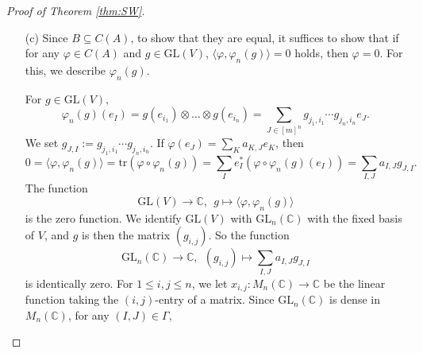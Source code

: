 \documentclass[twoside = false,	%
		headsepline,		%
		parskip = true,
		]{scrbook}						%
\begin{document}
\begin{proof}[Proof of Theorem \ref{thm:SW}]
\begin{enumerate}
            For this note that $C(A)=\mathrm{End}_{\mathfrak{S}_n}(V^{\otimes n})$. This suggests us to consider the projector in $\mathbb{C}[\mathfrak{S}_n]$:
            $$P:\mathrm{End}(V^{\otimes n})\to \mathrm{End}(V^{\otimes n}),\ \ \varphi\mapsto\frac{1}{\#\mathfrak{S}_n}\sum_{\sigma\in\mathfrak{S}_n}\rho_n(\sigma)\circ\varphi\circ\rho_n(\sigma^{-1}).$$
            The image of the projector is exactly $C(A)$. Moreover, if $\psi\in C(A)$ and $\varphi\in\mathrm{End}(V^{\otimes n})$ then 
            $$\langle P(\varphi),\psi\rangle=\frac{1}{\#\mathfrak{S}_n}\sum_{\sigma\in\mathfrak{S}_n}\mathrm{tr}(\rho_n(\sigma)\varphi\rho_n(\sigma^{-1})\psi)=\mathrm{tr}(\varphi\psi)=\langle\varphi,\psi\rangle$$
            since $\psi$ commutes with $\rho_n(\sigma^{-1})$.
        
            If $\psi\in C(A)$ is orthogonal to the entire $C(A)$ with respect to $\langle-,-\rangle$, then for any $\varphi\in\mathrm{End}(V^{\otimes n})$, 
            $$\langle\varphi,\psi\rangle=\langle P(\varphi),\psi\rangle=0,$$
            and hence $\psi=0$ since $\langle-,-\rangle$ is non-degenerate on $\mathrm{End}(V^{\otimes n})$.
            \item[(c)] Since $B\subseteq C(A)$, to show that they are equal, it suffices to show that if for any $\varphi\in C(A)$ and $g\in\mathrm{GL}(V)$, $\langle\varphi,\varphi_n(g)\rangle=0$ holds, then $\varphi=0$. For this, we describe $\varphi_n(g)$. 
        
            For $g\in\mathrm{GL}(V)$, 
            $$\varphi_n(g)(e_I)=g(e_{i_1})\otimes\ldots\otimes g(e_{i_n})=\sum_{J\in [m]^n}g_{j_1,i_1}\cdots g_{j_n,i_n}e_J.$$
            We set $g_{J,I}:=g_{j_1,i_1}\cdots g_{j_n,i_n}$. If $\varphi(e_J)=\sum_{K}a_{K,J}e_K$, then
            $$0=\langle\varphi,\varphi_n(g)\rangle=\mathrm{tr}(\varphi\circ\varphi_n(g))=\sum_{I}e_I^*(\varphi\circ\varphi_n(g)(e_I))=\sum_{I,J}a_{I,J}g_{J,I}.$$
            The function 
            $$\mathrm{GL}(V)\to \mathbb{C},\ \ g\mapsto \langle\varphi,\varphi_n(g)\rangle$$
            is the zero function. We identify $\mathrm{GL}(V)$ with $\mathrm{GL}_n(\mathbb{C})$ with the fixed basis of $V$, and  $g$ is then the matrix $(g_{i,j})$. So the function
            $$\mathrm{GL}_n(\mathbb{C})\to \mathbb{C},\ \ (g_{i,j})\mapsto \sum_{I,J}a_{I,J}g_{J,I}$$
            is identically zero. For $1\leq i,j\leq n$, we let $x_{i,j}:M_n(\mathbb{C})\to\mathbb{C}$ be the linear function taking the $(i,j)$-entry of a matrix. Since $\mathrm{GL}_n(\mathbb{C})$ is dense in $M_n(\mathbb{C})$, for any $(I,J)\in\Gamma$,
            

\end{enumerate}
\end{proof}
\end{document}
